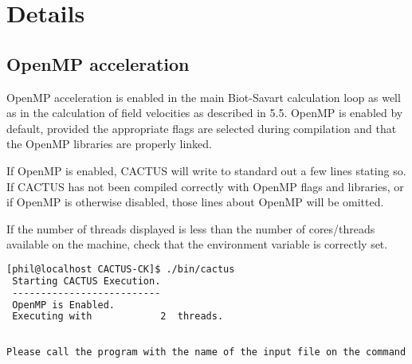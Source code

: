 \chapter{Details}
\section{OpenMP acceleration}
OpenMP acceleration is enabled in the main Biot-Savart calculation loop as well as in the calculation of field velocities as described in 5.5. OpenMP is enabled by default, provided the appropriate flags are selected during compilation and that the OpenMP libraries are properly linked.

If OpenMP is enabled, CACTUS will write to standard out a few lines stating so. If CACTUS has not been compiled correctly with OpenMP flags and libraries, or if OpenMP is otherwise disabled, those lines about OpenMP will be omitted.

If the number of threads displayed is less than the number of cores/threads available on the machine, check that the environment variable  is correctly set.

\begin{lstlisting}[language=bash]
[phil@localhost CACTUS-CK]$ ./bin/cactus 
 Starting CACTUS Execution.
 --------------------------
 OpenMP is Enabled.
 Executing with            2  threads.
 
 
Please call the program with the name of the input file on the command line. Ex. CACTUS INPUTFILE.in
\end{lstlisting}